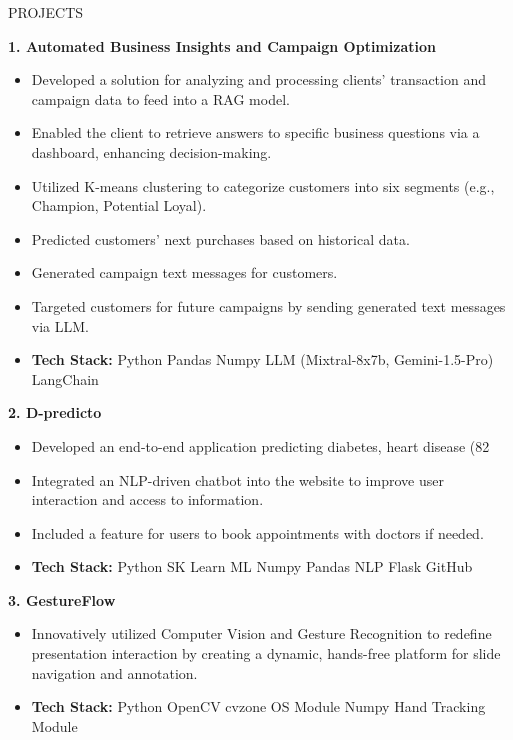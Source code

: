 \documentclass{resume} %
\begin{document}
\begin{rSection}{PROJECTS}

\textbf{1. Automated Business Insights and Campaign Optimization}
\begin{itemize}[leftmargin=0.5in]
    \item Developed a solution for analyzing and processing clients' transaction and campaign data to feed into a RAG model.
    \item Enabled the client to retrieve answers to specific business questions via a dashboard, enhancing decision-making.
    \item Utilized K-means clustering to categorize customers into six segments (e.g., Champion, Potential Loyal).
    \item Predicted customers' next purchases based on historical data.
    \item Generated campaign text messages for customers.
    \item Targeted customers for future campaigns by sending generated text messages via LLM.
    \item \textbf{Tech Stack:}  Python \textbar{} Pandas \textbar{} Numpy \textbar{} LLM (Mixtral-8x7b, Gemini-1.5-Pro) \textbar{} LangChain\end{itemize}
\vspace{4mm}

\textbf{2. D-predicto}
\begin{itemize}[leftmargin=0.5in]
    \item Developed an end-to-end application predicting diabetes, heart disease (82%
    \item Integrated an NLP-driven chatbot into the website to improve user interaction and access to information.
    \item Included a feature for users to book appointments with doctors if needed.
    \item \textbf{Tech Stack:} Python \textbar{} SK Learn \textbar{} ML \textbar{} Numpy \textbar{} Pandas \textbar{} NLP \textbar{} Flask \textbar{} GitHub
\end{itemize}
\vspace{4mm}

\textbf{3. GestureFlow}
\begin{itemize}[leftmargin=0.5in]
    \item Innovatively utilized Computer Vision and Gesture Recognition to redefine presentation interaction by creating a dynamic, hands-free platform for slide navigation and annotation.
    \item {\textbf{Tech Stack:}} Python \textbar{} OpenCV \textbar{} cvzone \textbar{} OS Module \textbar{} Numpy \textbar{} Hand Tracking Module
\end{itemize}

\end{rSection}
\end{document}
